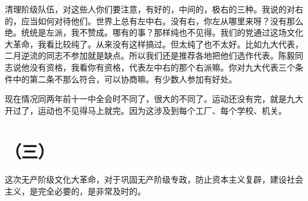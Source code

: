 清理阶级队伍，对这些人你们要注意，有好的，中间的，极右的三种。我说的对右的，应当如何对待他们。世界上总有左中右。没有右，你左从哪里来呀？没有那么绝。统统是左派，我不赞成。哪有的事？那样纯也不见得。我们的党通过这场文化大革命，我看比较纯了。从来没有这样搞过。但太纯了也不太好。比如九大代表，二月逆流的同志不参加就是缺点。所以我们还是推荐各地把他们选作代表。陈毅同志说他没有资格，我看你有资格，代表左中右的那个右派嘛。你对九大代表三个条件中的第二条不那么符合，可以协商嘛。有少数人参加有好处。

现在情况同两年前十一中全会时不同了，很大的不同了。运动还没有完，就是九大开过了，运动也不见得马上就完。因为这涉及到每个工厂、每个学校、机关。

\date{引自八届扩大的十二中全会公报}
\section*{（三）}

这次无产阶级文化大革命，对于巩固无产阶级专政，防止资本主义复辟，建设社会主义，是完全必要的，是非常及时的。

